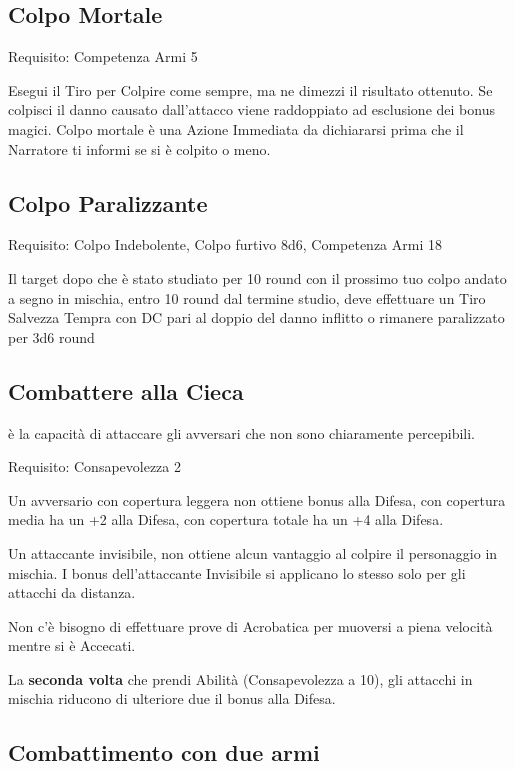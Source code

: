 \documentclass[a4paper,11pt,twoside,openany]{book}
\begin{document}
\subsection{Colpo Mortale}

Requisito: Competenza Armi 5

Esegui il Tiro per Colpire come sempre, ma ne dimezzi il risultato ottenuto. Se colpisci il danno causato dall'attacco viene raddoppiato ad esclusione dei bonus magici. Colpo mortale è una Azione Immediata da dichiararsi prima che il Narratore ti informi se si è colpito o meno.

\subsection{Colpo Paralizzante}

Requisito: Colpo Indebolente, Colpo furtivo 8d6, Competenza Armi 18

Il target dopo che è stato studiato per 10 round con il prossimo tuo colpo andato a segno in mischia, entro 10 round dal termine studio, deve effettuare un Tiro Salvezza Tempra con DC pari al doppio del danno inflitto o rimanere paralizzato per 3d6 round

\subsection{Combattere alla Cieca}

è la capacità di attaccare gli avversari che non sono chiaramente percepibili.

Requisito: Consapevolezza 2

Un avversario con copertura leggera non ottiene bonus alla Difesa, con copertura media ha un +2 alla Difesa, con copertura totale ha un +4 alla Difesa.

Un attaccante invisibile, non ottiene alcun vantaggio al colpire il personaggio in mischia. I bonus dell'attaccante Invisibile si applicano lo stesso solo per gli attacchi da distanza.

Non c'è bisogno di effettuare prove di Acrobatica per muoversi a piena velocità mentre si è Accecati.

La \textbf{seconda volta} che prendi Abilità (Consapevolezza a 10), gli attacchi in mischia riducono di ulteriore due il bonus alla Difesa.

\subsection{Combattimento con due armi}
\end{document}
